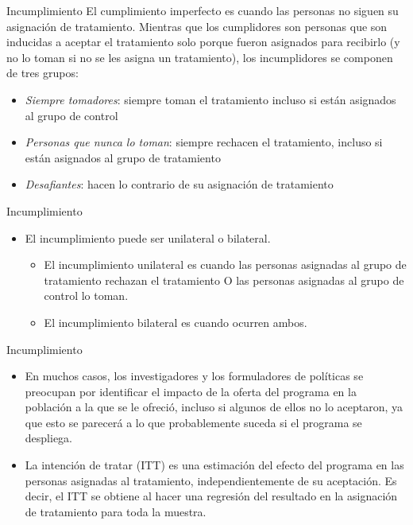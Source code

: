 \documentclass[11pt, aspectratio=169, compress]{beamer}
\begin{document}
\begin{frame}{Incumplimiento}
  El cumplimiento imperfecto es cuando las personas no siguen su asignación de tratamiento. Mientras que los cumplidores son personas que son inducidas a aceptar el tratamiento solo porque fueron asignados para recibirlo (y no lo toman si no se les asigna un tratamiento), los incumplidores se componen de tres grupos:

  \begin{itemize}
    \item \textit{Siempre tomadores}: siempre toman el tratamiento incluso si están asignados al grupo de control

    \item \textit{Personas que nunca lo toman}: siempre rechacen el tratamiento, incluso si están asignados al grupo de tratamiento

    \item \textit{Desafiantes}: hacen lo contrario de su asignación de tratamiento
  \end{itemize}

\end{frame}
\begin{frame}{Incumplimiento}

  \begin{itemize}
  \item El incumplimiento puede ser unilateral o bilateral. 
  
    \begin{itemize}
      \item El incumplimiento unilateral es cuando las personas asignadas al grupo de tratamiento rechazan el tratamiento O las personas asignadas al grupo de control lo toman. 
    
      \item El incumplimiento bilateral es cuando ocurren ambos.
    \end{itemize}

  \end{itemize}

\end{frame}
\begin{frame}{Incumplimiento}

  \begin{itemize}
    \item En muchos casos, los investigadores y los formuladores de políticas se preocupan por identificar el impacto de la oferta del programa en la población a la que se le ofreció, incluso si algunos de ellos no lo aceptaron, ya que esto se parecerá a lo que probablemente suceda si el programa se despliega. 
  
    \item La intención de tratar (ITT) es una estimación del efecto del programa en las personas asignadas al tratamiento, independientemente de su aceptación. Es decir, el ITT se obtiene al hacer una regresión del resultado en la asignación de tratamiento para toda la muestra.
  \end{itemize}
\end{frame}
\end{document}
